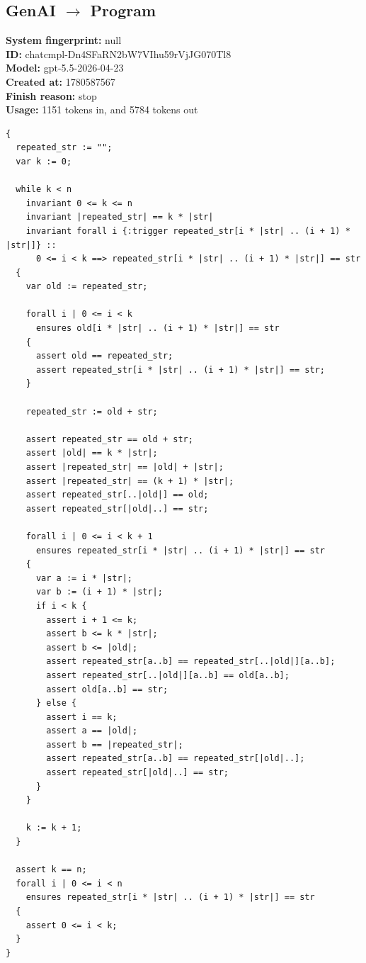 \documentclass{article}
\begin{document}
\subsection*{GenAI $\rightarrow$ Program}
\textbf{System fingerprint: }null
\\\textbf{ID: }chatcmpl-Dn4SFaRN2bW7VIhu59rVjJG070Tl8
\\\textbf{Model: }gpt-5.5-2026-04-23
\\\textbf{Created at: }1780587567
\\\textbf{Finish reason: }stop
\\\textbf{Usage: }1151 tokens in, and 5784 tokens out
\begin{lstlisting}
{
  repeated_str := "";
  var k := 0;

  while k < n
    invariant 0 <= k <= n
    invariant |repeated_str| == k * |str|
    invariant forall i {:trigger repeated_str[i * |str| .. (i + 1) * |str|]} ::
      0 <= i < k ==> repeated_str[i * |str| .. (i + 1) * |str|] == str
  {
    var old := repeated_str;

    forall i | 0 <= i < k
      ensures old[i * |str| .. (i + 1) * |str|] == str
    {
      assert old == repeated_str;
      assert repeated_str[i * |str| .. (i + 1) * |str|] == str;
    }

    repeated_str := old + str;

    assert repeated_str == old + str;
    assert |old| == k * |str|;
    assert |repeated_str| == |old| + |str|;
    assert |repeated_str| == (k + 1) * |str|;
    assert repeated_str[..|old|] == old;
    assert repeated_str[|old|..] == str;

    forall i | 0 <= i < k + 1
      ensures repeated_str[i * |str| .. (i + 1) * |str|] == str
    {
      var a := i * |str|;
      var b := (i + 1) * |str|;
      if i < k {
        assert i + 1 <= k;
        assert b <= k * |str|;
        assert b <= |old|;
        assert repeated_str[a..b] == repeated_str[..|old|][a..b];
        assert repeated_str[..|old|][a..b] == old[a..b];
        assert old[a..b] == str;
      } else {
        assert i == k;
        assert a == |old|;
        assert b == |repeated_str|;
        assert repeated_str[a..b] == repeated_str[|old|..];
        assert repeated_str[|old|..] == str;
      }
    }

    k := k + 1;
  }

  assert k == n;
  forall i | 0 <= i < n
    ensures repeated_str[i * |str| .. (i + 1) * |str|] == str
  {
    assert 0 <= i < k;
  }
}
\end{lstlisting}
\end{document}
